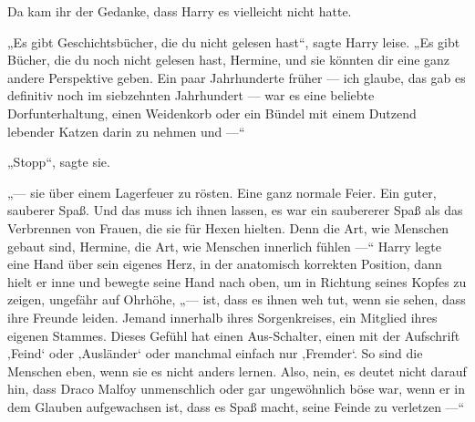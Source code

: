 Da kam ihr der Gedanke, dass Harry es vielleicht nicht hatte.

„Es gibt Geschichtsbücher, die du nicht gelesen hast“, sagte Harry leise.
„Es gibt Bücher, die du noch nicht gelesen hast, Hermine, und sie könnten dir eine ganz andere Perspektive geben. Ein paar Jahrhunderte früher — ich glaube, das gab es definitiv noch im siebzehnten Jahrhundert — war es eine beliebte Dorfunterhaltung, einen Weidenkorb oder ein Bündel mit einem Dutzend lebender Katzen darin zu nehmen und —“

„Stopp“, sagte sie.

„— sie über einem Lagerfeuer zu rösten. Eine ganz normale Feier. Ein guter, sauberer Spaß. Und das muss ich ihnen lassen, es war ein saubererer Spaß als das Verbrennen von Frauen, die sie für Hexen hielten. Denn die Art, wie Menschen gebaut sind, Hermine, die Art, wie Menschen innerlich fühlen —“ Harry legte eine Hand über sein eigenes Herz, in der anatomisch korrekten Position, dann hielt er inne und bewegte seine Hand nach oben, um in Richtung seines Kopfes zu zeigen, ungefähr auf Ohrhöhe, „— ist, dass es ihnen weh tut, wenn sie sehen, dass ihre Freunde leiden. Jemand innerhalb ihres Sorgenkreises, ein Mitglied ihres eigenen Stammes. Dieses Gefühl hat einen Aus-Schalter, einen mit der Aufschrift ‚Feind‘ oder ‚Ausländer‘ oder manchmal einfach nur ‚Fremder‘. So sind die Menschen eben, wenn sie es nicht anders lernen. Also, nein, es deutet nicht darauf hin, dass Draco Malfoy unmenschlich oder gar ungewöhnlich böse war, wenn er in dem Glauben aufgewachsen ist, dass es Spaß macht, seine Feinde zu verletzen —“

